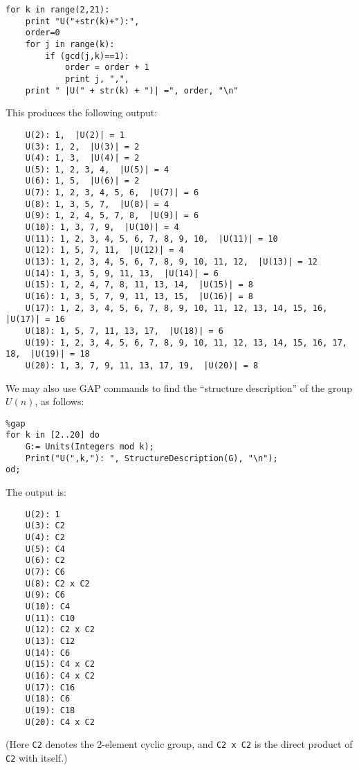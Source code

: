 \documentclass[12pt,reqno]{amsart}
\newcommand{\<}{\ensuremath{\langle}}
\renewcommand{\>}{\ensuremath{\rangle}}
\begin{document}
{\small
\begin{verbatim}
for k in range(2,21):
    print "U("+str(k)+"):",
    order=0
    for j in range(k):
        if (gcd(j,k)==1):
            order = order + 1
            print j, ",",
    print " |U(" + str(k) + ")| =", order, "\n"
\end{verbatim}
}
\medskip
\noindent This produces the following output:
{\footnotesize
\begin{verbatim}
    U(2): 1,  |U(2)| = 1 
    U(3): 1, 2,  |U(3)| = 2 
    U(4): 1, 3,  |U(4)| = 2 
    U(5): 1, 2, 3, 4,  |U(5)| = 4 
    U(6): 1, 5,  |U(6)| = 2 
    U(7): 1, 2, 3, 4, 5, 6,  |U(7)| = 6 
    U(8): 1, 3, 5, 7,  |U(8)| = 4 
    U(9): 1, 2, 4, 5, 7, 8,  |U(9)| = 6 
    U(10): 1, 3, 7, 9,  |U(10)| = 4 
    U(11): 1, 2, 3, 4, 5, 6, 7, 8, 9, 10,  |U(11)| = 10 
    U(12): 1, 5, 7, 11,  |U(12)| = 4 
    U(13): 1, 2, 3, 4, 5, 6, 7, 8, 9, 10, 11, 12,  |U(13)| = 12 
    U(14): 1, 3, 5, 9, 11, 13,  |U(14)| = 6 
    U(15): 1, 2, 4, 7, 8, 11, 13, 14,  |U(15)| = 8 
    U(16): 1, 3, 5, 7, 9, 11, 13, 15,  |U(16)| = 8 
    U(17): 1, 2, 3, 4, 5, 6, 7, 8, 9, 10, 11, 12, 13, 14, 15, 16,  |U(17)| = 16 
    U(18): 1, 5, 7, 11, 13, 17,  |U(18)| = 6 
    U(19): 1, 2, 3, 4, 5, 6, 7, 8, 9, 10, 11, 12, 13, 14, 15, 16, 17, 18,  |U(19)| = 18 
    U(20): 1, 3, 7, 9, 11, 13, 17, 19,  |U(20)| = 8 
\end{verbatim}
}

We may also use GAP commands to find the ``structure description'' of the group
$U(n)$, as follows:

{\small
\begin{verbatim}
%gap
for k in [2..20] do
    G:= Units(Integers mod k); 
    Print("U(",k,"): ", StructureDescription(G), "\n"); 
od;
\end{verbatim}
}
\noindent The output is:

{\footnotesize
\begin{verbatim}
    U(2): 1
    U(3): C2
    U(4): C2
    U(5): C4
    U(6): C2
    U(7): C6
    U(8): C2 x C2
    U(9): C6
    U(10): C4
    U(11): C10
    U(12): C2 x C2
    U(13): C12
    U(14): C6
    U(15): C4 x C2
    U(16): C4 x C2
    U(17): C16
    U(18): C6
    U(19): C18
    U(20): C4 x C2
\end{verbatim}
}
\noindent (Here {\tt C2} denotes the 2-element cyclic group, and {\tt C2 x C2}
is the direct product of {\tt C2} with itself.)
\end{document}
